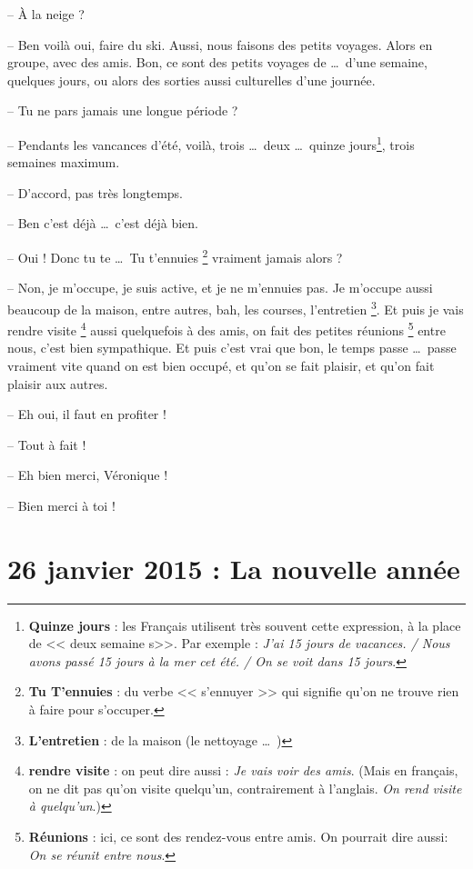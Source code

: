 \documentclass[11pt, french]{report}
\begin{document}
-- À la neige ?

-- Ben voilà oui, faire du ski. Aussi, nous faisons des petits voyages. Alors
en groupe, avec des amis. Bon, ce sont des petits voyages de \ldots\ d'une
semaine, quelques jours, ou alors des sorties aussi culturelles d'une journée.

-- Tu ne pars jamais une longue période ?

-- Pendants les vancances d'été, voilà, trois \ldots\ deux \ldots\ quinze
jours\footnote{\textbf{Quinze jours} : les Français utilisent très souvent
  cette expression, à la place de << deux semaine s>>. Par exemple :
  \textit{J'ai 15 jours de vacances. / Nous avons passé 15 jours à la mer
    cet été. / On se voit dans 15 jours}.}, trois semaines maximum.

-- D'accord, pas très longtemps.

-- Ben c'est déjà \ldots\ c'est déjà bien.

-- Oui ! Donc tu te \ldots\ Tu t'ennuies \footnote{\textbf{Tu T'ennuies} : du
  verbe << s'ennuyer >> qui signifie qu'on ne trouve rien à faire pour
  s'occuper.} vraiment jamais alors ?

-- Non, je m'occupe, je suis active, et je ne m'ennuies pas. Je m'occupe aussi
beaucoup de la maison, entre autres, bah, les courses, l'entretien
\footnote{\textbf{L'entretien} : de la maison (le nettoyage \ldots\ )}.
Et puis je vais rendre visite \footnote{\textbf{rendre visite} : on peut
  dire aussi : \textit{Je vais voir des amis}. (Mais en français, on ne dit pas
  qu'on visite quelqu'un, contrairement à l'anglais. \textit{On rend visite
    à quelqu'un}.)} aussi quelquefois à des amis, on fait des petites
réunions \footnote{\textbf{Réunions} : ici, ce sont des rendez-vous entre
  amis. On pourrait dire aussi: \textit{On se réunit entre nous}.} entre nous,
c'est bien sympathique. Et puis c'est vrai que bon, le temps passe \ldots\
passe vraiment vite quand on est bien occupé, et qu'on se fait plaisir, et qu'on
fait plaisir aux autres.

-- Eh oui, il faut en profiter !

-- Tout à fait !

-- Eh bien merci, Véronique !

-- Bien merci à toi !

\chapter{26 janvier 2015 : La nouvelle année}
\end{document}
